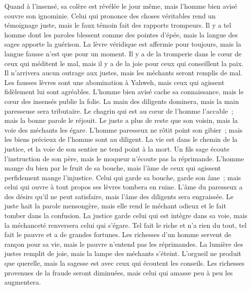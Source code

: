 \begin{multicols}{2}
Quand à l'insensé, sa colère est révélée le jour même, mais l'homme bien avisé couvre son ignominie.
Celui qui prononce des choses véritables rend un témoignage juste, mais le faux témoin fait des rapports trompeurs.
Il y a tel homme dont les paroles blessent comme des pointes d'épée, mais la langue des sages apporte la guérison.
La lèvre véridique est affermie pour toujours, mais la langue fausse n'est que pour un moment.
Il y a de la tromperie dans le cœur de ceux qui méditent le mal, mais il y a de la joie pour ceux qui conseillent la paix.
Il n'arrivera aucun outrage aux justes, mais les méchants seront remplis de mal.
Les fausses lèvres sont une abomination à Yahweh, mais ceux qui agissent fidèlement lui sont agréables.
L'homme bien avisé cache sa connaissance, mais le cœur des insensés publie la folie.
La main des diligents dominera, mais la main paresseuse sera tributaire.
Le chagrin qui est au cœur de l'homme l'accable~; mais la bonne parole le réjouit.
Le juste a plus de reste que son voisin, mais la voie des méchants les égare.
L'homme paresseux ne rôtit point son gibier~; mais les biens précieux de l'homme sont au diligent.
La vie est dans le chemin de la justice, et la voie de son sentier ne tend point à la mort.
\VerseOne{}Un fils sage écoute l'instruction de son père, mais le moqueur n'écoute pas la réprimande.
L'homme mange du bien par le fruit de sa bouche, mais l'âme de ceux qui agissent perfidement mange l'injustice.
Celui qui garde sa bouche, garde son âme~; mais celui qui ouvre à tout propos ses lèvres tombera en ruine.
L'âme du paresseux a des désirs qu'il ne peut satisfaire, mais l'âme des diligents sera engraissée.
Le juste hait la parole mensongère, mais elle rend le méchant odieux et le fait tomber dans la confusion.
La justice garde celui qui est intègre dans sa voie, mais la méchanceté renversera celui qui s'égare.
Tel fait le riche et n'a rien du tout, tel fait le pauvre et a de grandes fortunes.
Les richesses d'un homme servent de rançon pour sa vie, mais le pauvre n'entend pas les réprimandes.
La lumière des justes remplit de joie, mais la lampe des méchants s'éteint.
L'orgueil ne produit que querelle, mais la sagesse est avec ceux qui écoutent les conseils.
Les richesses provenues de la fraude seront diminuées, mais celui qui amasse peu à peu les augmentera.

\end{multicols}
